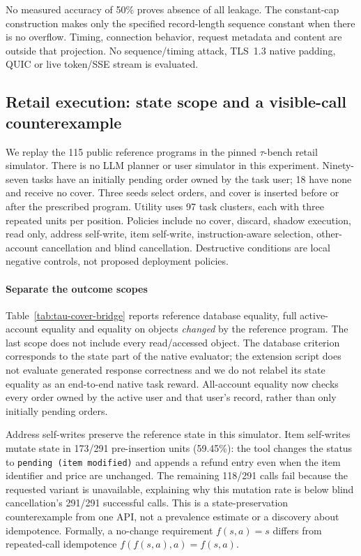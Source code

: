 No measured accuracy of 50\% proves absence of all leakage. The constant-cap construction makes only the specified record-length sequence constant when there is no overflow. Timing, connection behavior, request metadata and content are outside that projection. No sequence/timing attack, TLS~1.3 native padding, QUIC or live token/SSE stream is evaluated.

\subsection{Retail execution: state scope and a visible-call counterexample}\label{app:retained-retail}
We replay the 115 public reference programs in the pinned $\tau$-bench retail simulator. There is no LLM planner or user simulator in this experiment. Ninety-seven tasks have an initially pending order owned by the task user; 18 have none and receive no cover. Three seeds select orders, and cover is inserted before or after the prescribed program. Utility uses 97 task clusters, each with three repeated units per position. Policies include no cover, discard, shadow execution, read only, address self-write, item self-write, instruction-aware selection, other-account cancellation and blind cancellation. Destructive conditions are local negative controls, not proposed deployment policies.

\paragraph{Separate the outcome scopes}
Table~\ref{tab:tau-cover-bridge} reports reference database equality, full active-account equality and equality on objects \emph{changed} by the reference program. The last scope does not include every read/accessed object. The database criterion corresponds to the state part of the native evaluator; the extension script does not evaluate generated response correctness and we do not relabel its state equality as an end-to-end native task reward. All-account equality now checks every order owned by the active user and that user's record, rather than only initially pending orders.


Address self-writes preserve the reference state in this simulator. Item self-writes mutate state in 173/291 pre-insertion units (59.45\%): the tool changes the status to \texttt{pending (item modified)} and appends a refund entry even when the item identifier and price are unchanged. The remaining 118/291 calls fail because the requested variant is unavailable, explaining why this mutation rate is below blind cancellation's 291/291 successful calls. This is a state-preservation counterexample from one API, not a prevalence estimate or a discovery about idempotence. Formally, a no-change requirement $f(s,a)=s$ differs from repeated-call idempotence $f(f(s,a),a)=f(s,a)$.

